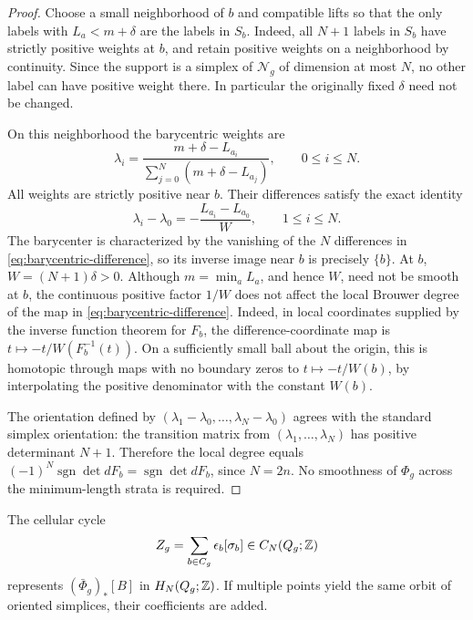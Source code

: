 \begin{proof}
Choose a small neighborhood of $b$ and compatible
lifts so that the only labels with
$L_a<m+\delta$ are the labels in $S_b$.
Indeed, all $N+1$ labels in $S_b$ have strictly
positive weights at $b$, and retain positive weights
on a neighborhood by continuity. Since the support
is a simplex of $\mathcal N_g$ of dimension at most $N$,
no other label can have positive weight there.
In particular the originally fixed $\delta$ need not
be changed.

On this neighborhood the barycentric weights are
\[
 \lambda_i=\frac{m+\delta-L_{a_i}}{
       \sum_{j=0}^{N}(m+\delta-L_{a_j})},
 \qquad 0\leq i\leq N.
\]
All weights are strictly positive near $b$.
Their differences satisfy the exact identity
\begin{equation}\label{eq:barycentric-difference}
 \lambda_i-\lambda_0
 =-\frac{L_{a_i}-L_{a_0}}{W},
 \qquad 1\leq i\leq N.
\end{equation}
The barycenter is characterized by the vanishing
of the $N$ differences in
\eqref{eq:barycentric-difference}, so its inverse
image near $b$ is precisely $\{b\}$.
At $b$, $W=(N+1)\delta>0$. Although
$m=\min_a L_a$, and hence $W$, need not be
smooth at $b$, the continuous positive factor
$1/W$ does not affect the local Brouwer degree
of the map in \eqref{eq:barycentric-difference}.
Indeed, in local coordinates supplied by the
inverse function theorem for $F_b$, the
difference-coordinate map is
$t\mapsto-t/W(F_b^{-1}(t))$.
On a sufficiently small ball about the origin,
this is homotopic through maps with no boundary
zeros to $t\mapsto-t/W(b)$, by interpolating the
positive denominator with the constant $W(b)$.

The orientation defined by
$(\lambda_1-\lambda_0,\ldots,\lambda_N-\lambda_0)$
agrees with the standard simplex orientation:
the transition matrix from
$(\lambda_1,\ldots,\lambda_N)$ has
positive determinant $N+1$.
Therefore the local degree equals
$(-1)^N\operatorname{sgn}\det dF_b
=\operatorname{sgn}\det dF_b$, since $N=2n$.
No smoothness of $\Phi_g$ across the
minimum-length strata is required.
\end{proof}

\begin{lemma}\label{lem:localized-cycle}
The cellular cycle
\begin{equation}\label{eq:nerve-cycle}
 Z_g=\sum_{b\in C_g}\epsilon_b[\sigma_b]
 \in C_N(Q_g;\mathbb{Z})
\end{equation}
represents $(\bar\Phi_g)_*[B]$ in $H_N(Q_g;\mathbb{Z})$.
If multiple points yield the same orbit of
oriented simplices, their coefficients are added.
\end{lemma}


